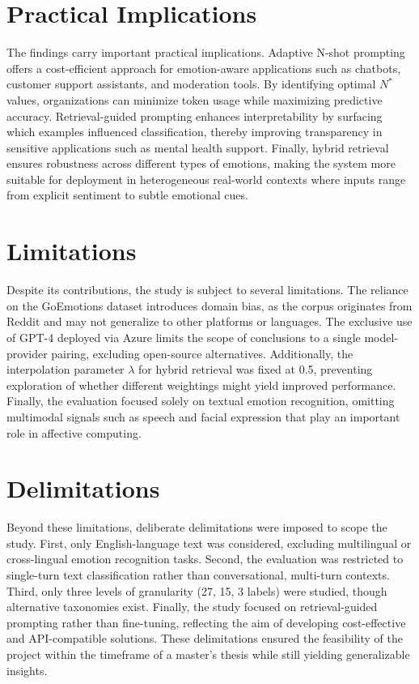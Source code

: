\section{Practical Implications}
The findings carry important practical implications. Adaptive N-shot prompting offers a cost-efficient approach for emotion-aware applications such as chatbots, customer support assistants, and moderation tools. By identifying optimal $N^{\ast}$ values, organizations can minimize token usage while maximizing predictive accuracy. Retrieval-guided prompting enhances interpretability by surfacing which examples influenced classification, thereby improving transparency in sensitive applications such as mental health support. Finally, hybrid retrieval ensures robustness across different types of emotions, making the system more suitable for deployment in heterogeneous real-world contexts where inputs range from explicit sentiment to subtle emotional cues.

\section{Limitations}
Despite its contributions, the study is subject to several limitations. The reliance on the GoEmotions dataset introduces domain bias, as the corpus originates from Reddit and may not generalize to other platforms or languages. The exclusive use of GPT-4 deployed via Azure limits the scope of conclusions to a single model-provider pairing, excluding open-source alternatives. Additionally, the interpolation parameter $\lambda$ for hybrid retrieval was fixed at 0.5, preventing exploration of whether different weightings might yield improved performance. Finally, the evaluation focused solely on textual emotion recognition, omitting multimodal signals such as speech and facial expression that play an important role in affective computing.

\section{Delimitations}
Beyond these limitations, deliberate delimitations were imposed to scope the study. First, only English-language text was considered, excluding multilingual or cross-lingual emotion recognition tasks. Second, the evaluation was restricted to single-turn text classification rather than conversational, multi-turn contexts. Third, only three levels of granularity (27, 15, 3 labels) were studied, though alternative taxonomies exist. Finally, the study focused on retrieval-guided prompting rather than fine-tuning, reflecting the aim of developing cost-effective and API-compatible solutions. These delimitations ensured the feasibility of the project within the timeframe of a master’s thesis while still yielding generalizable insights.

